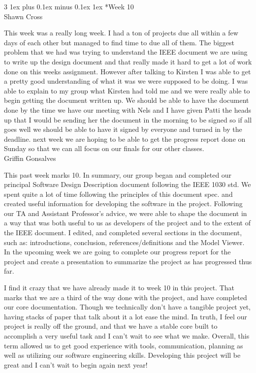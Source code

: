 \documentclass[letterpaper, 10pt, draftclsnofoot, compsoc, onecolumn]{IEEEtran}
\makeatletter
\def\subsubsection{\@startsection{subsubsection}%
                                 {3}%
                                 {\z@}%
                                 {1ex plus 0.1ex minus 0.1ex}%
                                 {1ex}%
                                 {\normalfont\normalsize}}%
\makeatother
\begin{document}
\subsubsection*{Week 10}\hspace*{\fill} \\
Shawn Cross

This week was a really long week. I had a ton of projects due all within a few days of each other but managed to find time to due all of them. The biggest problem that we had was trying to understand the IEEE document we are using to write up the design document and that really made it hard to get a lot of work done on this weeks assignment. However after talking to Kirsten I was able to get a pretty good understanding of what it was we were supposed to be doing. I was able to explain to my group what Kirsten had told me and we were really able to begin getting the document written up. We should be able to have the document done by the time we have our meeting with Nels and I have given Patti the heads up that I would be sending her the document in the morning to be signed so if all goes well we should be able to have it signed by everyone and turned in by the deadline. next week we are hoping to be able to get the progress report done on Sunday so that we can all focus on our finals for our other classes.\\

Griffin Gonsalves

This past week marks 10. In summary, our group began and completed our principal Software Design Description document following the IEEE 1030 std. We spent quite a lot of time following the principles of this document spec. and created useful information for developing the software in the project. Following our TA and Assistant Professor's advice, we were able to shape the document in a way that was both useful to us as developers of the project and to the extent of the IEEE document. I edited, and completed several sections in the document, such as: introductions, conclusion, references/definitions and the Model Viewer. In the upcoming week we are going to complete our progress report for the project and create a presentation to summarize the project as has progressed thus far.

I find it crazy that we have already made it to week 10 in this project. That marks that we are a third of the way done with the project, and have completed our core documentation. Though we technically don't have a tangible project yet, having stacks of paper that talk about it a lot ease the mind. In truth, I feel our project is really off the ground, and that we have a stable core built to accomplish a very useful task and I can't wait to see what we make. Overall, this term allowed us to get good experience with tools, communication, planning as well as utilizing our software engineering skills. Developing this project will be great and I can't wait to begin again next year!\\
\end{document}
